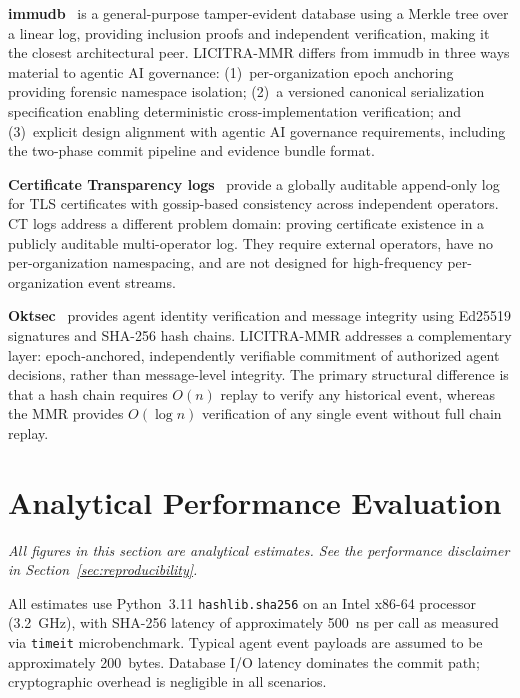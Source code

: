 \documentclass{article}
\begin{document}
\textbf{immudb}~\cite{immudb} is a general-purpose tamper-evident database using
a Merkle tree over a linear log, providing inclusion proofs and independent
verification, making it the closest architectural peer. LICITRA-MMR differs from
immudb in three ways material to agentic AI governance: (1)~per-organization
epoch anchoring providing forensic namespace isolation; (2)~a versioned canonical
serialization specification enabling deterministic cross-implementation
verification; and (3)~explicit design alignment with agentic AI governance
requirements, including the two-phase commit pipeline and evidence bundle format.

\textbf{Certificate Transparency logs}~\cite{laurie2013} provide a globally
auditable append-only log for TLS certificates with gossip-based consistency
across independent operators. CT logs address a different problem domain: proving
certificate existence in a publicly auditable multi-operator log. They require
external operators, have no per-organization namespacing, and are not designed
for high-frequency per-organization event streams.

\textbf{Oktsec}~\cite{oktsec} provides agent identity verification and message
integrity using Ed25519 signatures and SHA-256 hash chains. LICITRA-MMR addresses
a complementary layer: epoch-anchored, independently verifiable commitment of
authorized agent decisions, rather than message-level integrity. The primary
structural difference is that a hash chain requires $O(n)$ replay to verify any
historical event, whereas the MMR provides $O(\log n)$ verification of any
single event without full chain replay.

\section{Analytical Performance Evaluation}
\label{sec:performance}

\noindent\textit{All figures in this section are analytical estimates. See the
performance disclaimer in Section~\ref{sec:reproducibility}.}

\medskip
All estimates use Python~3.11 \texttt{hashlib.sha256} on an Intel x86-64
processor (3.2~GHz), with SHA-256 latency of approximately 500~ns per call as
measured via \texttt{timeit} microbenchmark. Typical agent event payloads are
assumed to be approximately 200~bytes. Database I/O latency dominates the commit
path; cryptographic overhead is negligible in all scenarios.
\end{document}
